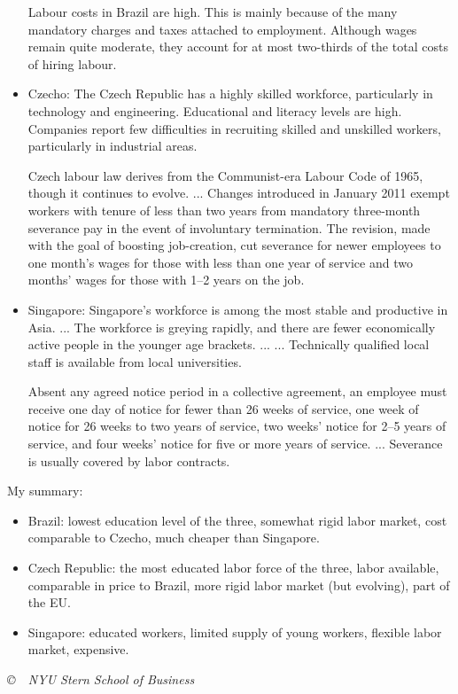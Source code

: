 \documentclass[12pt]{exam}
\begin{document}
\begin{questions}
\begin{solution}
\begin{itemize}
Labour costs in Brazil are high. This is mainly because of the many mandatory
charges and taxes attached to employment. Although wages remain quite
moderate, they account for at most two-thirds of the total costs of hiring labour.

\item Czecho:
The Czech Republic has a highly skilled workforce, particularly in technology
and engineering. Educational and literacy levels are high. Companies report
few difficulties in recruiting skilled and unskilled workers, particularly in
industrial areas.

Czech labour law derives from the Communist-era Labour Code of
1965, though it continues to evolve. ...
Changes introduced in January 2011 exempt workers with tenure of
less than two years from mandatory three-month severance pay in the event of
involuntary termination. The revision, made with the goal of boosting
job-creation, cut
severance for newer employees to one month's wages for those with less than
one year of service and two months' wages for those with 1–2 years on the job.

\item Singapore:
Singapore's workforce is among the most stable and productive in Asia.
...
The workforce is greying rapidly, and there are fewer economically
active people in the younger age brackets. ...
...
Technically qualified local staff is available from local universities.

Absent any agreed notice period in a collective agreement,
an employee must receive one day of notice for fewer than 26 weeks of service,
one week of notice for 26 weeks to two years of service, two weeks' notice for
2–5 years of service, and four weeks' notice for five or more years of service.
...  Severance is usually covered by labor contracts.

\end{itemize}


My summary:
\begin{itemize}
\item Brazil:  lowest education level of the three, somewhat rigid labor market,
cost comparable to Czecho, much cheaper than Singapore.
\item Czech Republic:  the most educated labor force of the three, labor available,
comparable in price
 to Brazil, more rigid labor market (but evolving), part of the EU.
\item Singapore:  educated workers, limited supply of young workers,
flexible labor market, expensive.
\end{itemize}

\end{solution}


\end{questions}

\vfill \centerline{\it \copyright \ \number\year \
NYU Stern School of Business}
\end{document}
